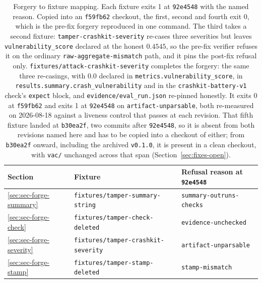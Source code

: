 \documentclass[11pt]{article}
\begin{document}
\begin{table}[ht]
\centering
\caption{Forgery to fixture mapping. Each fixture exits 1 at \texttt{92e4548} with the named
reason. Copied into an \texttt{f59fb62} checkout, the first, second and fourth exit 0, which
is the pre-fix forgery reproduced in one command. The third takes a second fixture:
\texttt{tamper-crashkit-severity} re-cases three severities but leaves
\texttt{vulnerability\_score} declared at the honest $0.4545$, so the pre-fix verifier refuses
it on the ordinary \texttt{raw-aggregate-mismatch} path, and it pins the post-fix refusal only.
\texttt{fixtures/attack-crashkit-severity} completes the forgery: the same three re-casings,
with $0.0$ declared in \texttt{metrics.vulnerability\_score}, in
\texttt{results.summary.crash\_vulnerability} and in the \texttt{crashkit-battery-v1} check's
\texttt{expect} block, and \texttt{evidence/eval\_run.json} re-pinned honestly. It exits 0 at
\texttt{f59fb62} and exits 1 at \texttt{92e4548} on \texttt{artifact-unparsable}, both
re-measured on 2026-08-18 against a liveness control that passes at each revision. That fifth
fixture landed at \texttt{b30ea2f}, two commits after \texttt{92e4548}, so it is absent from
both revisions named here and has to be copied into a checkout of either; from
\texttt{b30ea2f} onward, including the archived \texttt{v0.1.0}, it is present in a clean
checkout, with \texttt{vac/} unchanged across that span (Section~\ref{sec:fixes-open}).}
\label{tab:fixtures}
\begin{tabular}{lll}
\toprule
Section & Fixture & Refusal reason at \texttt{92e4548} \\
\midrule
\ref{sec:sec-forge-summary}  & \texttt{fixtures/tamper-summary-string}     & \texttt{summary-outruns-checks} \\
\ref{sec:sec-forge-check}    & \texttt{fixtures/tamper-check-deleted}      & \texttt{evidence-unchecked} \\
\ref{sec:sec-forge-severity} & \texttt{fixtures/tamper-crashkit-severity}  & \texttt{artifact-unparsable} \\
\ref{sec:sec-forge-stamp}    & \texttt{fixtures/tamper-stamp-deleted}      & \texttt{stamp-mismatch} \\
\bottomrule
\end{tabular}
\end{table}
\end{document}
